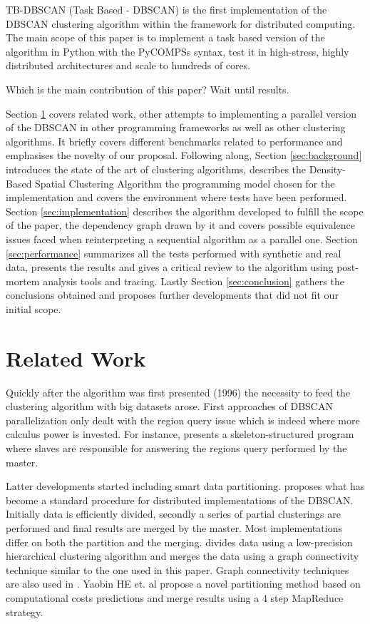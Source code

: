 \documentclass[10pt,journal,compsoc]{IEEEtran}
\begin{document}
TB-DBSCAN (Task Based - DBSCAN) is the first implementation of the DBSCAN clustering algorithm within the \cite{compss} framework for distributed computing. The main scope of this paper is to implement a task based version of the algorithm in Python with the PyCOMPSs syntax, test it in high-stress, highly distributed architectures and scale to hundreds of cores.

Which is the main contribution of this paper? Wait until results.

Section \ref{sec:related_work} covers related work, other attempts to implementing a parallel version of the DBSCAN in other programming frameworks as well as other clustering algorithms. It briefly covers different benchmarks related to performance and emphasises the novelty of our proposal. Following along, Section \ref{sec:background} introduces the state of the art of clustering algorithms, describes the Density-Based Spatial Clustering Algorithm the programming model chosen for the implementation and covers the environment where tests have been performed. Section \ref{sec:implementation} describes the algorithm developed to fulfill the scope of the paper, the dependency graph drawn by it and covers possible equivalence issues faced when reinterpreting a sequential algorithm as a parallel one. Section \ref{sec:performance} summarizes all the tests performed with synthetic and real data, presents the results and gives a critical review to the algorithm using post-mortem analysis tools and tracing. Lastly Section \ref{sec:conclusion} gathers the conclusions obtained and proposes further developments that did not fit our initial scope.

\section{Related Work} \label{sec:related_work}

Quickly after the algorithm was first presented (1996) the necessity to feed the clustering algorithm with big datasets arose. First approaches of DBSCAN parallelization only dealt with the region query issue which is indeed where more calculus power is invested. For instance, \cite{related_1} presents a skeleton-structured program where slaves are responsible for answering the regions query performed by the master.

Latter developments started including smart data partitioning. \cite{related_2} proposes what has become a standard procedure for distributed implementations of the DBSCAN. Initially data is efficiently divided, secondly a series of partial clusterings are performed and final results are merged by the master. Most implementations differ on both the partition and the merging. \cite{related_2} divides data using a low-precision hierarchical clustering algorithm and merges the data using a graph connectivity technique similar to the one used in this paper. Graph connectivity techniques are also used in \cite{related_4}. Yaobin HE et. al \cite{related_3} propose a novel partitioning method based on computational costs predictions and merge results using a 4 step MapReduce strategy. 
\end{document}

